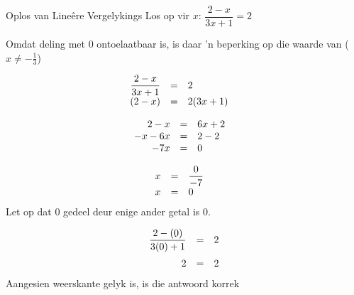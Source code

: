 \begin{wex}{Oplos van Lineêre Vergelykings}
{Los op vir $x$: $\dfrac{2-x}{3x+1}=2$} 
{
Omdat deling met $0$ ontoelaatbaar is, is daar ’n beperking op die waarde van ($x\neq -\frac{1}{3}$)

\begin{equation*}
    \begin{array}{ccll}\hfill \dfrac{2-x}{3x+1}& =& 2\hfill & \\
	\hfill (2-x)& =& 2(3x+1)\hfill & \\ 
    \end{array}
\end{equation*}

\begin{equation*}
    \begin{array}{ccll}
	\hfill 2-x& =& 6x+2\hfill & \hfill \\ 
	\hfill -x-6x& =& 2-2\hfill & \hfill \\ 
	\hfill -7x& =& 0\hfill & \hfill
    \end{array}
\end{equation*}

\begin{equation*}
    \begin{array}{ccll}

	\hfill x& =& \dfrac{0}{-7}\hfill & \\
	\hfill x& =& 0\hfill & \hfill 
    \end{array}
\end{equation*}
Let op dat $0$ gedeel deur enige ander getal is $0$.


\begin{equation*}
    \begin{array}{ccc}\hfill \dfrac{2-(0)}{3(0)+1}& =& 2\hfill \vspace{6pt}\\
	\hfill 2& =& 2\hfill 
\end{array}
\end{equation*}
Aangesien weerskante gelyk is, is die antwoord korrek
}
\end{wex}


